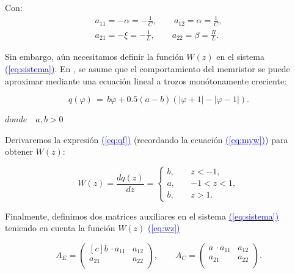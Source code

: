 \documentclass[12pt,a4paper]{report} %
\newcommand{\eref}[1]{\hyperref[#1]{\textcolor{blue}{(\ref*{#1})}}}
\newcommand{\eref}[1]{\hyperref[#1]{\textcolor{blue}{\textit{(\ref*{#1})}}}}
\begin{document}
	Con:
	\begin{equation}
		\label{eq:amatriz}
	\begin{gathered}
		a_{11}=-\alpha=-\frac{1}{C}, \qquad a_{12}=\alpha=\frac{1}{C},\\[2mm]
		a_{21}=-\xi =-\frac{1}{L}, \qquad a_{22}=\beta = \frac{R}{L}.
	\end{gathered}
	\end{equation}\smallskip
	
	\vspace{0.5cm}\noindent Sin embargo, aún necesitamos definir la función $W(z)$ en el sistema \eref{eq:sistema}. En \cite{chuaoscillator2008}, se asume que el comportamiento del memristor se puede aproximar mediante una ecuación lineal a trozos monótonamente creciente:
	
	\begin{equation}
		q(\varphi)\,=\,b\varphi+0.5(a-b)(|\varphi+1|-|\varphi-1|).
		\label{eq:qf}
	\end{equation}
    \begin{center}
    	$ donde \quad a,b> 0$
    \end{center}
    
    \vspace{0.5cm}\noindent Derivaremos la expresión \eref{eq:qf} (recordando la ecuación \eref{eq:myw}) para obtener $W(z)$:

   \begin{equation}
    	W(z) = \frac{dq(z)}{dz} =
    	\begin{cases}
    			b,  \quad & z < -1, \\
    			a,  \quad & -1 < z < 1, \\
    			b,  \quad & z > 1.
    	\end{cases}
    	\label{eq:wz}
    \end{equation}\smallskip
    
    \noindent Finalmente, definimos dos matrices auxiliares en el sistema \eref{eq:sistema} teniendo en cuenta la función $W(z)$ \eref{eq:wz}
    
    \begin{equation}
    	A_E=\begin{pmatrix*}[c]
    		b \, \cdotp a_{11} & a_{12}\\
    	             a_{21} & a_{22}\\
    	\end{pmatrix*}, \qquad 	A_C=\begin{pmatrix*}
    	a \, \cdotp a_{11} & a_{12}\\
    	a_{21} & a_{22}\\
    	\end{pmatrix*}.
    \end{equation}\smallskip
    
\end{document}
